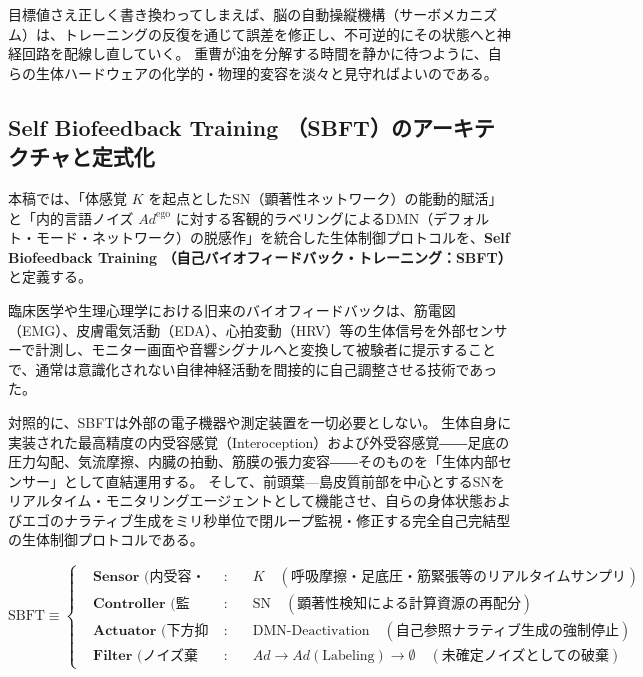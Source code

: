 目標値さえ正しく書き換わってしまえば、脳の自動操縦機構（サーボメカニズム）は、トレーニングの反復を通じて誤差を修正し、不可逆的にその状態へと神経回路を配線し直していく。
重曹が油を分解する時間を静かに待つように、自らの生体ハードウェアの化学的・物理的変容を淡々と見守ればよいのである。

\subsection{Self Biofeedback Training \texttrademark（SBFT\texttrademark ）のアーキテクチャと定式化}

本稿では、「体感覚 $K$ を起点としたSN（顕著性ネットワーク）の能動的賦活」と「内的言語ノイズ $Ad^{\mathrm{ego}}$ に対する客観的ラベリングによるDMN（デフォルト・モード・ネットワーク）の脱感作」を統合した生体制御プロトコルを、\textbf{Self Biofeedback Training \texttrademark （自己バイオフィードバック・トレーニング：SBFT\texttrademark ）}と定義する。

臨床医学や生理心理学における旧来のバイオフィードバックは、筋電図（EMG）、皮膚電気活動（EDA）、心拍変動（HRV）等の生体信号を外部センサーで計測し、モニター画面や音響シグナルへと変換して被験者に提示することで、通常は意識化されない自律神経活動を間接的に自己調整させる技術であった。

対照的に、SBFTは外部の電子機器や測定装置を一切必要としない。
生体自身に実装された最高精度の内受容感覚（Interoception）および外受容感覚――足底の圧力勾配、気流摩擦、内臓の拍動、筋膜の張力変容――そのものを「生体内部センサー」として直結運用する。
そして、前頭葉—島皮質前部を中心とするSNをリアルタイム・モニタリングエージェントとして機能させ、自らの身体状態およびエゴのナラティブ生成をミリ秒単位で閉ループ監視・修正する完全自己完結型の生体制御プロトコルである。

\begin{equation}
    \text{SBFT} \equiv \left\{
    \begin{aligned}
        &\textbf{Sensor (内受容・外受容)} & : & \quad K \quad (\text{呼吸摩擦・足底圧・筋緊張等のリアルタイムサンプリング}) \\
        &\textbf{Controller (監視・切替)} & : & \quad \mathrm{SN} \quad (\text{顕著性検知による計算資源の再配分}) \\
        &\textbf{Actuator (下方抑制)} & : & \quad \mathrm{DMN\text{-}Deactivation} \quad (\text{自己参照ナラティブ生成の強制停止}) \\
        &\textbf{Filter (ノイズ棄却)} & : & \quad Ad \xrightarrow{} Ad (\text{Labeling}) \longrightarrow \emptyset \quad (\text{未確定ノイズとしての破棄})
    \end{aligned}
    \right.
\end{equation}

